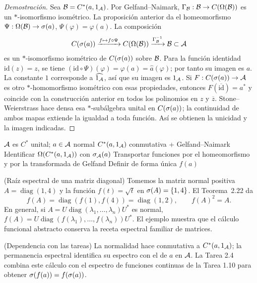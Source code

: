 \begin{proof}[Demostración]
Sea $\mathcal B=C^*(a,1_\mathcal A)$. Por Gelfand--Naimark,
$\Gamma_\mathcal B:\mathcal B\to C(\Omega(\mathcal B))$ es un $*$-isomorfismo isométrico. La proposición anterior da el
homeomorfismo
$\Psi:\Omega(\mathcal B)\to\sigma(a)$, $\Psi(\varphi)=\varphi(a)$. La composición
\[
 C(\sigma(a))\xrightarrow{f\mapsto f\circ\Psi} C(\Omega(\mathcal B))
 \xrightarrow{\Gamma_\mathcal B^{-1}}\mathcal B\subset\mathcal A
\]
es un $*$-isomorfismo isométrico de $C(\sigma(a))$ sobre $\mathcal B$.
Para la función identidad $\mathrm{id}(z)=z$, se tiene
$(\mathrm{id}\circ\Psi)(\varphi)=\varphi(a)=\widehat a(\varphi)$; por
tanto su imagen es $a$. La constante $1$ corresponde a
$\widehat{1_\mathcal A}$, así que su imagen es $1_\mathcal A$.
Si $F:C(\sigma(a))\to\mathcal A$ es otro $*$-homomorfismo isométrico con esas
propiedades, entonces $F(\overline{\mathrm{id}})=a^*$ y coincide con la
construcción anterior en todos los polinomios en $z$ y $\overline z$.
Stone--Weierstrass hace densa esa $*$-subálgebra unital en
$C(\sigma(a))$; la continuidad de ambos mapas extiende la igualdad a toda
función. Así se obtienen la unicidad y la imagen indicadas.
\end{proof}

\proofdiagrambranch
{$\mathcal A$ es $C^*$ unital; $a\in\mathcal A$ normal}
{$C^*(a,1_\mathcal A)$ conmutativa + Gelfand--Naimark}
{Identificar $\Omega(C^*(a,1_\mathcal A))$ con $\sigma_\mathcal A(a)$}
{Transportar funciones por el homeomorfismo y por la transformada de Gelfand}
{Definir de forma única $f(a)$}

\begin{cthejemplo}{(Raíz espectral de una matriz diagonal)}
Tomemos la matriz normal positiva
$A=\operatorname{diag}(1,4)$ y la función
$f(t)=\sqrt t$ en $\sigma(A)=\{1,4\}$. El Teorema~2.22 da
\[
 f(A)=\operatorname{diag}(f(1),f(4))
     =\operatorname{diag}(1,2),
 \qquad f(A)^2=A.
\]
En general, si
$A=U\operatorname{diag}(\lambda_1,\ldots,\lambda_n)U^*$ es normal,
$f(A)=U\operatorname{diag}(f(\lambda_1),\ldots,f(\lambda_n))U^*$.
El ejemplo muestra que el cálculo funcional abstracto conserva la receta
espectral familiar de matrices.
\end{cthejemplo}

\begin{cthnota}{(Dependencia con las tareas)}
La normalidad hace conmutativa a $C^*(a,1_\mathcal A)$; la permanencia espectral identifica
su espectro con el de $a$ en $\mathcal A$. La Tarea 2.4 combina este cálculo con el espectro
de funciones continuas de la Tarea 1.10 para obtener
$\sigma(f(a))=f(\sigma(a))$.
\end{cthnota}


